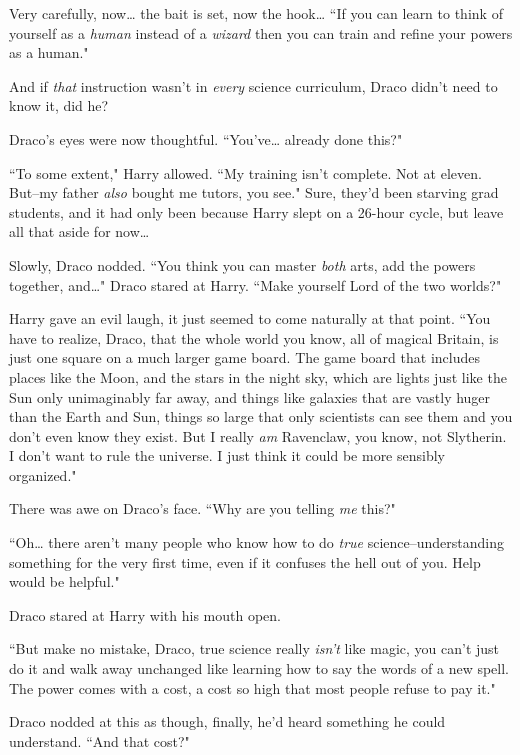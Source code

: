 Very carefully, now{\ldots} the bait is set, now the hook{\ldots} ``If you can learn to think of yourself as a \emph{human} instead of a \emph{wizard} then you can train and refine your powers as a human."

And if \emph{that} instruction wasn't in \emph{every} science curriculum, Draco didn't need to know it, did he?

Draco's eyes were now thoughtful. ``You've{\ldots} already done this?"

``To some extent," Harry allowed. ``My training isn't complete. Not at eleven. But\---my father \emph{also} bought me tutors, you see." Sure, they'd been starving grad students, and it had only been because Harry slept on a 26-hour cycle, but leave all that aside for now{\ldots}

Slowly, Draco nodded. ``You think you can master \emph{both} arts, add the powers together, and{\ldots}" Draco stared at Harry. ``Make yourself Lord of the two worlds?"

Harry gave an evil laugh, it just seemed to come naturally at that point. ``You have to realize, Draco, that the whole world you know, all of magical Britain, is just one square on a much larger game board. The game board that includes places like the Moon, and the stars in the night sky, which are lights just like the Sun only unimaginably far away, and things like galaxies that are vastly huger than the Earth and Sun, things so large that only scientists can see them and you don't even know they exist. But I really \emph{am} Ravenclaw, you know, not Slytherin. I don't want to rule the universe. I just think it could be more sensibly organized."

There was awe on Draco's face. ``Why are you telling \emph{me} this?"

``Oh{\ldots} there aren't many people who know how to do \emph{true} science\---understanding something for the very first time, even if it confuses the hell out of you. Help would be helpful."

Draco stared at Harry with his mouth open.

``But make no mistake, Draco, true science really \emph{isn't} like magic, you can't just do it and walk away unchanged like learning how to say the words of a new spell. The power comes with a cost, a cost so high that most people refuse to pay it."

Draco nodded at this as though, finally, he'd heard something he could understand. ``And that cost?"

